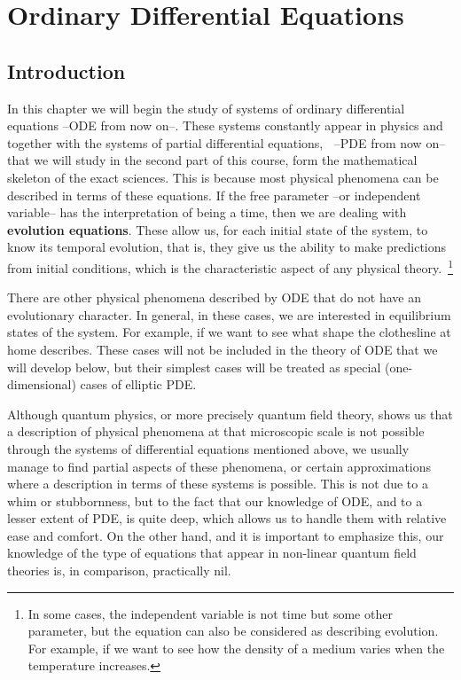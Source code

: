 \chapter{Ordinary Differential Equations}
\label{Ecuaciones_Diferenciales_Ordinarias}




\section{Introduction}

In this chapter we will begin the study of systems of 
ordinary differential equations --ODE from now on--.
These systems constantly appear in physics and together with
the systems of partial differential equations, $\;\;$--PDE
from now on-- that we will study in the second part of this course,
form the mathematical skeleton of the exact sciences. This is because
most physical phenomena can be
described in terms of these equations. 
If the free parameter --or independent variable-- has the
interpretation of being a time, then we are dealing with
{\bf evolution equations}. 
These allow us, for each initial state of the system, 
to know its temporal evolution, that is, they give us the ability to
make predictions from initial conditions, which is the
characteristic aspect of any physical theory.~\footnote{
In some cases, the independent variable is not time
but some other parameter, but the equation can also be 
considered as describing evolution. For
example, if we want to see how the density of a medium varies when
the temperature increases.}

There are other physical phenomena described by ODE that do not have
an evolutionary character. In general, in these cases, we are
interested in equilibrium states of the system. 
For example, if we want to see what shape the clothesline at home describes.
These cases will not be included in the
theory of ODE that we will develop below, but 
their simplest cases will be
treated as special (one-dimensional) cases of elliptic PDE.


Although quantum physics, or more precisely quantum field theory,
shows us that a description of physical phenomena
at that microscopic scale is not possible through the systems of
differential equations mentioned above, we usually manage
to find partial aspects of these phenomena, or certain
approximations where a description in terms
of these systems is possible. This is not due to a whim or stubbornness, 
but to the fact that
our knowledge of ODE, and to a lesser extent of PDE, is
quite deep, which allows us to handle them with relative ease
and comfort.
On the other hand, and it is important to emphasize this, our knowledge of the
type of equations that appear in non-linear quantum field theories
is, in comparison, practically nil.



